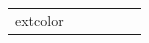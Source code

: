 \begin{table}[H]
\begin{tabular}{|l|p{2.5cm}|p{2.61cm}|p{2.61cm}|p{2.61cm}|p{2.61cm}|}
extcolor{white
\end{tabular}
\end{table}
